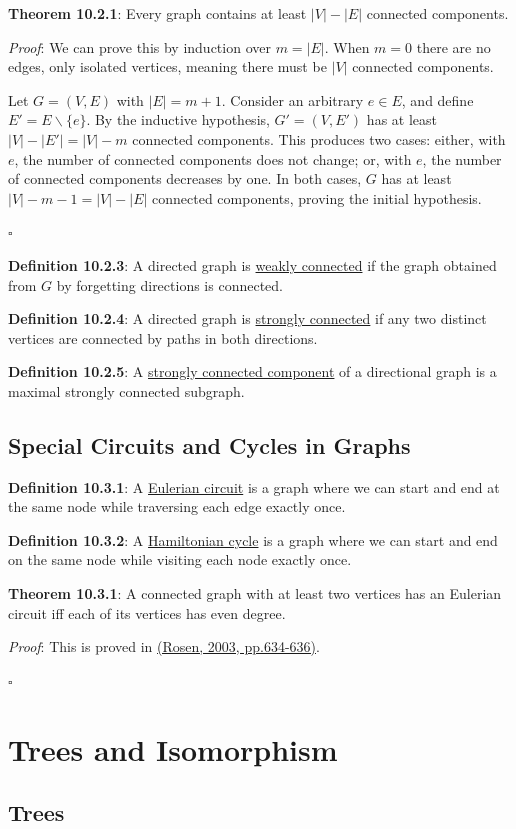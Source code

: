 \documentclass{article}
\newcommand{\separate}[1] {\vspace{#1 pt}\noindent}
\newcommand{\definition}[2]{\textbf{Definition #1}: #2\label{def:#1}}
\newcommand{\proof}[2]{\textit{Proof}: #2 \begin{flushright}\(\square\)\end{flushright}\label{prf:#1}}
\newcommand{\theorem}[3]{\textbf{Theorem #1}: #2 \par\separate{3}\proof{thm:#1}{#3}\label{thm:#1}}
\begin{document}
\newpage\noindent\theorem{10.2.1}{Every graph contains at least \(|V|-|E|\) connected components.}
{We can prove this by induction over \(m=|E|\). When \(m=0\) there are no edges, only isolated vertices, meaning there must be \(|V|\) connected components.

Let \(G=(V,E)\) with \(|E|=m+1\). Consider an arbitrary \(e\in E\), and define \(E'=E \backslash \{e\}\). By the inductive hypothesis, \(G'=(V,E')\) has at least \(|V|-|E'|=|V|-m\) connected components. This produces two cases: either, with \(e\), the number of connected components does not change; or, with \(e\), the number of connected components decreases by one. In both cases, \(G\) has at least \(|V|-m-1=|V|-|E|\) connected components, proving the initial hypothesis.}

\separate{7}\definition{10.2.3}{A directed graph is \underline{weakly connected} if the graph obtained from \(G\) by forgetting directions is connected.}

\separate{7}\definition{10.2.4}{A directed graph is \underline{strongly connected} if any two distinct vertices are connected by paths in both directions.}

\separate{7}\definition{10.2.5}{A \underline{strongly connected component} of a directional graph is a maximal strongly connected subgraph.}

\subsection{Special Circuits and Cycles in Graphs}

\definition{10.3.1}{A \underline{Eulerian circuit} is a graph where we can start and end at the same node while traversing each edge exactly once.}

\separate{7}\definition{10.3.2}{A \underline{Hamiltonian cycle} is a graph where we can start and end on the same node while visiting each node exactly once.}

\separate{7}\theorem{10.3.1}{A connected graph with at least two vertices has an Eulerian circuit iff each of its vertices has even degree.}
{This is proved in \hyperref[cit:2.eulerianCircuits]{(Rosen, 2003, pp.634-636)}.}

\section{Trees and Isomorphism}

\subsection{Trees}
\end{document}
